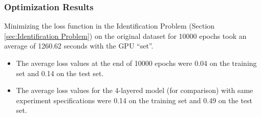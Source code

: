 \documentclass[12pt]{article}
\begin{document}
    \subsubsection{Optimization Results} \label{sec:IdProbRes - Optimization}
    Minimizing the loss function in the Identification Problem (Section \ref{sec:Identification Problem}) on the original dataset for 10000 epochs took an average of 1260.62 seconds with the GPU ``set''.
    \begin{itemize}
        \item The average loss values at the end of 10000 epochs were 0.04 on the training set and 0.14 on the test set.
        \item The average loss values for the 4-layered model (for comparison) with same experiment specifications were 0.14 on the training set and 0.49 on the test set.
    \end{itemize}
\end{document}
